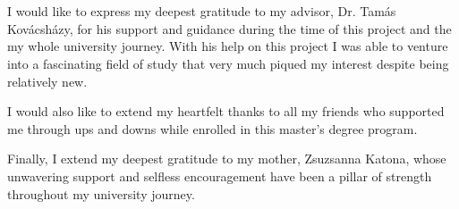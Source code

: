 \chapter*{\koszonetnyilvanitas}

I would like to express my deepest gratitude to my advisor, Dr. Tamás Kovácsházy, for his support and guidance during the time of this project and the my whole university journey. With his help on this project I was able to venture into a fascinating field of study that very much piqued my interest despite being relatively new.

I would also like to extend my heartfelt thanks to all my friends who supported me through ups and downs while enrolled in this master's degree program.

Finally, I extend my deepest gratitude to my mother, Zsuzsanna Katona, whose unwavering support and selfless encouragement have been a pillar of strength throughout my university journey.
